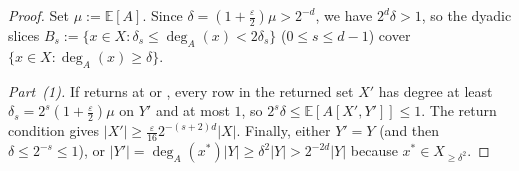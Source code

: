 \documentclass[11pt]{article}
\theoremstyle{definition}
\newcommand{\E}{\mathbb{E}}
\newcommand{\abs}[1]{\left\lvert #1 \right\rvert}
\newcommand{\dens}[1]{\E[#1]}
\begin{document}
\begin{proof}
Set $\mu := \dens{A}$. Since $\delta = (1 + \frac{\varepsilon}{2})\mu > 2^{-d}$, we have $2^d\delta > 1$, so the dyadic slices $B_s := \{x \in X : \delta_s \le \deg_A(x) < 2\delta_s\}$ ($0 \le s \le d-1$) cover $\{x \in X : \deg_A(x) \ge \delta\}$.

\emph{Part~(1).} If  returns at  or , every row in the returned set $X'$ has degree at least $\delta_s = 2^s(1 + \frac{\varepsilon}{2})\mu$ on $Y'$ and at most $1$, so $2^s\delta \le \dens{A[X', Y']} \le 1$. The return condition gives $\abs{X'} \ge \frac{\varepsilon}{16} 2^{-(s+2)d}\abs{X}$. Finally, either $Y' = Y$ (and then $\delta \le 2^{-s} \le 1$), or $\abs{Y'} = \deg_A(x^*)\abs{Y} \ge \delta^2\abs{Y} > 2^{-2d}\abs{Y}$ because $x^* \in X_{\ge \delta^2}$.


\end{proof}
\end{document}
